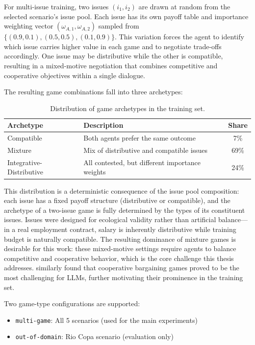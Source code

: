 \documentclass[12pt,a4paper]{article}
\begin{document}
For multi-issue training, two issues $(i_1, i_2)$ are drawn at random from the selected scenario's issue pool. Each issue has its own payoff table and importance weighting vector $(\omega_{A,1}, \omega_{A,2})$ sampled from $\{(0.9, 0.1), (0.5, 0.5), (0.1, 0.9)\}$. This variation forces the agent to identify which issue carries higher value in each game and to negotiate trade-offs accordingly. One issue may be distributive while the other is compatible, resulting in a mixed-motive negotiation that combines competitive and cooperative objectives within a single dialogue.

The resulting game combinations fall into three archetypes:

\begin{table}[H]
\centering
\caption{Distribution of game archetypes in the training set.}
\label{tab:archetypes_dist}
\begin{tabular}{llc}
\toprule
\textbf{Archetype} & \textbf{Description} & \textbf{Share} \\
\midrule
Compatible & Both agents prefer the same outcome & 7\% \\
Mixture & Mix of distributive and compatible issues & 69\% \\
Integrative-Distributive & All contested, but different importance weights & 24\% \\
\bottomrule
\end{tabular}
\end{table}

This distribution is a deterministic consequence of the issue pool composition: each issue has a fixed payoff structure (distributive or compatible), and the archetype of a two-issue game is fully determined by the types of its constituent issues. Issues were designed for ecological validity rather than artificial balance---in a real employment contract, salary is inherently distributive while training budget is naturally compatible. The resulting dominance of mixture games is desirable for this work: these mixed-motive settings require agents to balance competitive and cooperative behavior, which is the core challenge this thesis addresses. \citet{davidson2024evaluatinglanguagemodelagency} similarly found that cooperative bargaining games proved to be the most challenging for LLMs, further motivating their prominence in the training set.

Two game-type configurations are supported:
\begin{itemize}
    \item \texttt{multi-game}: All 5 scenarios (used for the main experiments)
    \item \texttt{out-of-domain}: Rio Copa scenario (evaluation only)
\end{itemize}
\end{document}
